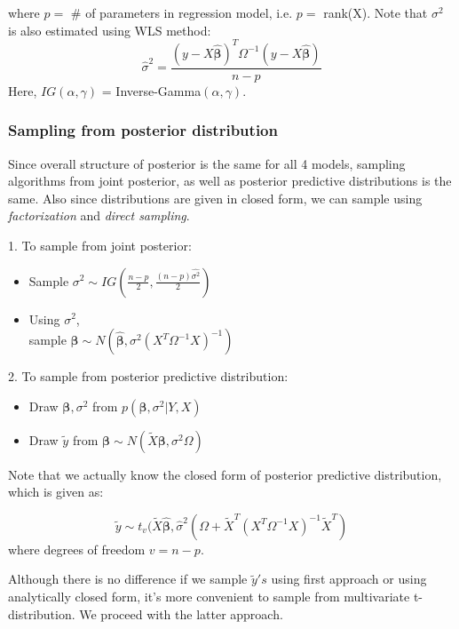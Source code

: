 \documentclass[11pt,twocolumn]{asaproc}
\begin{document}
where $p = $ \# of parameters in regression model, i.e. $p =$ rank(X). Note that $\sigma^2$ is also estimated using WLS method: $$\hat{\sigma}^2 = \frac{(y-X\hat{\pmb{\beta}})^T \Omega^{-1} (y-X\hat{\pmb{\beta}})}{n-p}$$   Here, $IG(\alpha, \gamma)$ = Inverse-Gamma$(\alpha, \gamma)$. 


\subsubsection{Sampling from posterior distribution}

Since overall structure of posterior is the same for all 4 models, sampling algorithms from joint posterior, as well as posterior predictive distributions is the same. Also since distributions are given in closed form, we can sample using \textit{factorization} and \textit{direct sampling}.

\vspace{5mm}

1. To sample from joint posterior:

\begin{itemize}
\item Sample $\sigma^2 \sim IG (\frac{n-p}{2}, \frac{(n-p)\hat{\sigma^2}}{2})$
\item Using $\sigma^2$, \\ sample $\pmb{\beta} \sim N(\hat{\pmb{\beta}}, \sigma^2(X^{T}\Omega^{-1}X)^{-1})$
\end{itemize}


2. To sample from posterior predictive distribution:

\begin{itemize}
\item Draw $\pmb{\beta}, \sigma^2$ from $p(\pmb{\beta}, \sigma^2 | Y, X)$
\item Draw $\tilde{y}$ from $\pmb{\beta} \sim N(\tilde{X}\pmb{\beta}, \sigma^2\Omega)$
\end{itemize}

Note that we actually know the closed form of posterior predictive distribution, which is given as: 

$$\tilde{y} \sim t_{v}(\tilde{X}\hat{\pmb{\beta}}, \hat{\sigma}^2(\Omega + \tilde{X}^T (X^T \Omega^{-1} X) ^{-1}\tilde{X}^T)$$ where degrees of freedom $v = n-p$. 

Although there is no difference if we sample $\tilde{y}'s$ using first approach or using analytically closed form, it's more convenient to sample from multivariate t-distribution. We proceed with the latter approach. 
\end{document}
